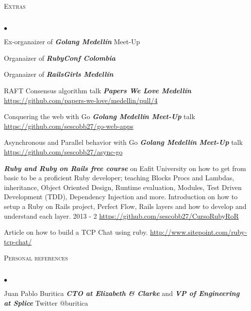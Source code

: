 \documentclass[a4paper]{article}
\newcommand{\lineunder}{\vspace*{-8pt} \\ \hspace*{-18pt} \hrulefill \\}
\newcommand{\header}[1]{{\hspace*{-15pt}\vspace*{6pt}
\textsc{#1}} \vspace*{-6pt} \lineunder}
\newcommand{\employer}[3]{{
\textbf{#1} (#2)\\ \underline{\textbf{\emph{#3}}}\\ }}
\newenvironment{achievements}{\begin{list}{$\bullet$}{\topsep 0pt \itemsep
-2pt}}{\vspace*{4pt}\end{list}}
\newcommand{\emphasys}[1]{\textbf{\emph{#1}}}
\begin{document}
\header{Extras}
\begin{achievements}
\item{Ex-organaizer of \emphasys{Golang Medell\'in} Meet-Up}
\item{Organaizer of \emphasys{RubyConf Colombia}}
\item{Organaizer of \emphasys{RailsGirls Medell\'in}}
\item{RAFT Consensus algorithm talk \emphasys{Papers We Love Medell\'in} \url{https://github.com/papers-we-love/medellin/pull/4}}
\item{Conquering the web with Go \emphasys{Golang Medell\'in Meet-Up} talk \url{https://github.com/sescobb27/go-web-apps}}
\item{Asynchronous and Parallel behavior with Go \emphasys{Golang Medell\'in Meet-Up} talk \url{https://github.com/sescobb27/async-go}}
\item{\emphasys{Ruby and Ruby on Rails free course} on Eafit University on how to get from basic to be a proficient Ruby developer; teaching Blocks Procs and Lambdas, inheritance, Object Oriented Design, Runtime evaluation, Modules, Test Driven Development (TDD), Dependency Injection and more. Introduction on how to setup a Ruby on Rails project, Perfect Flow, Rails layers and how to develop and understand each layer. 2013 - 2 \url{https://github.com/sescobb27/CursoRubyRoR}}
\item{Article on how to build a TCP Chat using ruby. \url{http://www.sitepoint.com/ruby-tcp-chat/}}
\end{achievements}


\header{Personal references}
\begin{achievements}
\item{Juan Pablo Buritica \emphasys{CTO at Elizabeth \& Clarke} and \emphasys{VP of Engineering at Splice} Twitter @buritica}
\end{achievements}
\end{document}
